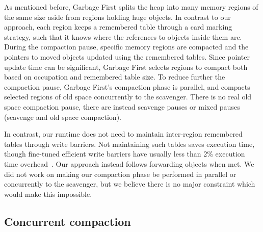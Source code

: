 \documentclass[sigplan,10pt,review,anonymous]{acmart}\settopmatter{printfolios=true,printccs=false,printacmref=false}
\begin{document}
As mentioned before, Garbage First \cite{G1} splits the heap into many memory regions of the same size aside from regions holding huge objects. In contrast to our approach, each region keeps a remembered table through a card marking strategy, such that it knows where the references to objects inside them are. During the compaction pause, specific memory regions are compacted and the pointers to moved objects updated using the remembered tables. Since pointer update time can be significant, Garbage First selects regions to compact both based on occupation and remembered table size. To reduce further the compaction pause, Garbage First's compaction phase is parallel, and compacts selected regions of old space concurrently to the scavenger. There is no real old space compaction pause, there are instead scavenge pauses or mixed pauses (scavenge and old space compaction). 

In contrast, our runtime does not need to maintain inter-region remembered tables through write barriers. Not maintaining such tables saves execution time, though fine-tuned efficient write barriers have usually less than 2\% execution time overhead~\cite{BarriersFriendFoe}. Our approach  instead follows forwarding objects when met.
We did not work on making our compaction phase be performed in parallel or concurrently to the scavenger, but we believe there is no major constraint which would make this impossible. 


\subsection{Concurrent compaction}
\label{sec:ConcCompactRel}
\end{document}
